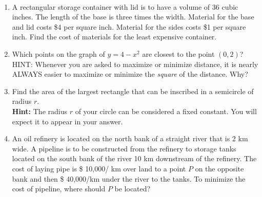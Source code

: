 \documentclass[11pt,fleqn]{article}
\begin{document}
\vspace*{-0.7in}

\begin{center}
  \Large{}\\
\end{center}
\begin{enumerate}
\item A rectangular storage container with lid is to have a volume of 36 cubic inches. The length of the base is three times the width. Material for the base and lid costs \$4 per square inch. Material for the sides costs \$1 per square inch. Find the cost of materials for the least expensive container.
\vfill
\item Which points on the graph of $y = 4-x^2$ are
  closest to the point $(0, 2)$?\\
   HINT: Whenever you are asked to maximize or minimize distance, it is nearly ALWAYS easier to maximize or minimize the \emph{square} of the distance. Why?
\vfill
\newpage
\item Find the area of the largest rectangle that can
  be inscribed in a semicircle of radius $r$.\\ \textbf{Hint:} The radius $r$ of your circle can be considered a fixed constant. You will expect it to appear in your answer. 
  \vfill
\item An oil refinery is located on the north bank of a
straight river that is 2 km wide. A pipeline is to be constructed from
the refinery to storage tanks located on the south bank of the river 10
km downstream of the refinery. The cost of laying pipe is \$ 10,000/
km over land to a point $P$ on the opposite bank and then \$ 40,000/km
under the river to the tanks. To minimize the cost of pipeline, where
should $P$ be located? 
\vfill

\end{enumerate}
\end{document}
